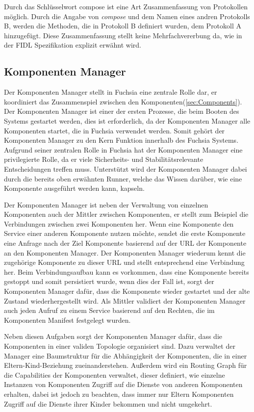 \documentclass[a4paper]{scrartcl}
\begin{document}
Durch das Schlüsselwort compose ist eine Art Zusammenfassung von Protokollen möglich. Durch die Angabe von \textit{compose} und dem Namen eines andren Protokolls B, werden die Methoden, die in Protokoll B definiert wurden, dem Protokoll A hinzugefügt. Diese Zusammenfassung stellt keine Mehrfachvererbung da, wie in der FIDL Spezifikation explizit erwähnt wird. \cite{Fuchsia.FIDL.Specitifcation}
\subsection{Komponenten Manager}
Der Komponenten Manager stellt in Fuchsia eine zentrale Rolle dar, er koordiniert das Zusammenspiel zwischen den Komponenten(\ref{sec:Components}). Der Komponenten Manager ist einer der ersten Prozesse, die beim Booten des Systems gestartet werden, dies ist erforderlich, da der Komponenten Manager alle Komponenten startet, die in Fuchsia verwendet werden. Somit gehört der Komponenten Manager zu den Kern Funktion innerhalb des Fuchsia Systems. Aufgrund seiner zentralen Rolle in Fuchsia hat der Komponenten Manager eine privilegierte Rolle, da er viele Sicherheits- und Stabilitätsrelevante Entscheidungen treffen muss. Unterstützt wird der Komponenten Manager dabei durch die bereits oben erwähnten Runner, welche das Wissen darüber, wie eine Komponente ausgeführt werden kann, kapseln.

Der Komponenten Manager ist neben der Verwaltung von einzelnen Komponenten auch der Mittler zwischen Komponenten, er stellt zum Beispiel die Verbindungen zwischen zwei Komponenten her. Wenn eine Komponente den Service einer anderen Komponente nutzen möchte, sendet die erste Komponente eine Anfrage nach der Ziel Komponente basierend auf der URL der Komponente an den Komponenten Manager. Der Komponenten Manager wiederum kennt die zugehörige Komponente zu dieser URL und stellt entsprechend eine Verbindung her. Beim Verbindungsaufbau kann es vorkommen, dass eine Komponente bereits gestoppt und somit persistiert wurde, wenn dies der Fall ist, sorgt der Komponenten Manager dafür, dass die Komponente wieder gestartet und der alte Zustand wiederhergestellt wird. Als Mittler validiert der Komponenten Manager auch jeden Aufruf zu einem Service basierend auf den Rechten, die im Komponenten Manifest festgelegt wurden. \cite{Fuchsia.Component.Lifecycle}\cite{Fuchsia.Component.Topology}

Neben diesen Aufgaben sorgt der Komponenten Manager dafür, dass die Komponenten in einer validen Topologie organisiert sind. Dazu verwaltet der Manager eine Baumstruktur für die Abhängigkeit der Komponenten, die in einer Eltern-Kind-Beziehung zueinanderstehen. Außerdem wird ein Routing Graph für die Capabilities der Komponenten verwaltet, dieser definiert, wie einzelne Instanzen von Komponenten Zugriff auf die Dienste von anderen Komponenten erhalten, dabei ist jedoch zu beachten, dass immer nur Eltern Komponenten Zugriff auf die Dienste ihrer Kinder bekommen und nicht umgekehrt.\cite{Fuchsia.Component.Topology}
\end{document}
